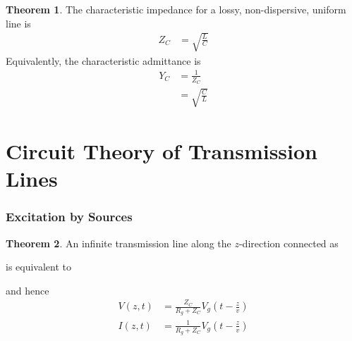 \documentclass[titlepage, fleqn, a4paper, 12pt, twoside]{article}
\theoremstyle{definition}
\theoremstyle{theorem}
\newtheorem{theorem}{Theorem}
\begin{document}
\begin{theorem}
	The characteristic impedance for a lossy, non-dispersive, uniform line is
	\begin{align*}
		Z_C &= \sqrt{\frac{L}{C}}
	\end{align*}
	Equivalently, the characteristic admittance is
	\begin{align*}
		Y_C &= \frac{1}{Z_C}\\
		&= \sqrt{\frac{C}{L}}
	\end{align*}
\end{theorem}

\clearpage
\part{Circuit Theory of Transmission Lines}

\section{Excitation by Sources}

\begin{theorem}
	An infinite transmission line along the $z$-direction connected as
	\begin{figure}[H]
		\centering
	\end{figure}
	is equivalent to
	\begin{figure}[H]
		\centering
	\end{figure}
	and hence
	\begin{align*}
		V(z,t) &= \frac{Z_C}{R_g + Z_C} V_g \left( t - \frac{z}{v} \right)\\
		I(z,t) &= \frac{1}{R_g + Z_C} V_g \left( t - \frac{z}{v} \right)
	\end{align*}
\end{theorem}
\end{document}
